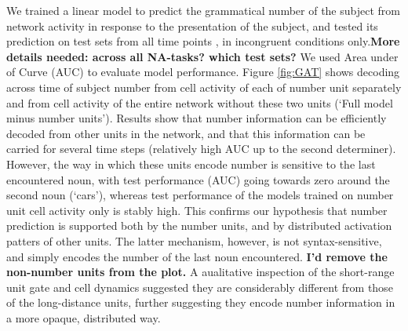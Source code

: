 We trained a linear model to predict the grammatical number of the
subject from network activity in response to the presentation of the
subject, and tested its prediction on test sets from all time points
, in incongruent conditions
only.\textbf{More details needed: across all NA-tasks? which test
  sets?} We used Area under of Curve (AUC) to evaluate model
performance. Figure \ref{fig:GAT} shows decoding across time of
subject number from cell activity of each of number unit separately
and from cell activity of the entire network without these two units
(`Full model minus number units'). Results show that number
information can be efficiently decoded from other units in the
network, and that this information can be carried for several time
steps (relatively high AUC up to the second determiner). However, the
way in which these units encode number is sensitive to the last
encountered noun, with test performance (AUC) going towards zero
around the second noun (`cars'), whereas test performance of the
models trained on number unit cell activity only is stably high. This
confirms our hypothesis that number prediction is supported both by
the number units, and by distributed activation patters of other
units. The latter mechanism, however, is not syntax-sensitive, and
simply encodes the number of the last noun encountered. \textbf{I'd
  remove the non-number units from the plot.} A aualitative inspection
of the short-range unit gate and cell dynamics suggested they are
considerably different from those of the long-distance units, further
suggesting they encode number information in a more opaque,
distributed way.




